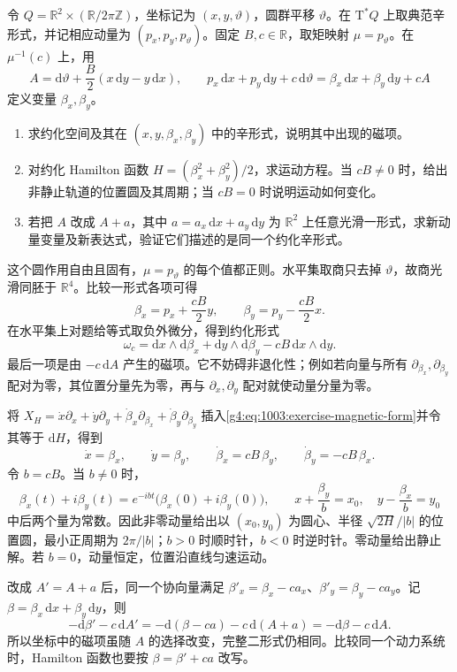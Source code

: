 \begin{exercise}\label{g4:ex:1003:magnetic-cotangent}
	令 \(Q=\mathbb R^2\times(\mathbb R/2\pi\mathbb Z)\)，坐标记为 \((x,y,\vartheta)\)，圆群平移 \(\vartheta\)。在 \(\mathrm{T}^*Q\) 上取典范辛形式，并记相应动量为 \((p_x,p_y,p_\vartheta)\)。固定 \(B,c\in\mathbb R\)，取矩映射 \(\mu=p_\vartheta\)。在 \(\mu^{-1}(c)\) 上，用
	\[
		A=\mathrm{d}\vartheta+\frac B2(x\,\mathrm{d}y-y\,\mathrm{d}x),
		\qquad
		p_x\,\mathrm{d}x+p_y\,\mathrm{d}y+c\,\mathrm{d}\vartheta
		=\beta_x\,\mathrm{d}x+\beta_y\,\mathrm{d}y+cA
	\]
	定义变量 \(\beta_x,\beta_y\)。
	\begin{enumerate}
		\item 求约化空间及其在 \((x,y,\beta_x,\beta_y)\) 中的辛形式，说明其中出现的磁项。
		\item 对约化 Hamilton 函数 \(H=(\beta_x^2+\beta_y^2)/2\)，求运动方程。当 \(cB\ne0\) 时，给出非静止轨道的位置圆及其周期；当 \(cB=0\) 时说明运动如何变化。
		\item 若把 \(A\) 改成 \(A+a\)，其中 \(a=a_x\,\mathrm{d}x+a_y\,\mathrm{d}y\) 为 \(\mathbb R^2\) 上任意光滑一形式，求新动量变量及新表达式，验证它们描述的是同一个约化辛形式。
	\end{enumerate}
\end{exercise}
\begin{solution}
	这个圆作用自由且固有，\(\mu=p_\vartheta\) 的每个值都正则。水平集取商只去掉 \(\vartheta\)，故商光滑同胚于 \(\mathbb R^4\)。比较一形式各项可得
	\[
		\beta_x=p_x+\frac{cB}{2}y,\qquad
		\beta_y=p_y-\frac{cB}{2}x.
	\]
	在水平集上对题给等式取负外微分，得到约化形式
	\begin{equation}\label{g4:eq:1003:exercise-magnetic-form}
		\omega_c
		=\mathrm{d}x\wedge\mathrm{d}\beta_x
		 +\mathrm{d}y\wedge\mathrm{d}\beta_y
		 -cB\,\mathrm{d}x\wedge\mathrm{d}y.
	\end{equation}
	最后一项是由 \(-c\,\mathrm{d}A\) 产生的磁项。它不妨碍非退化性；例如若向量与所有 \(\partial_{\beta_x},\partial_{\beta_y}\) 配对为零，其位置分量先为零，再与 \(\partial_x,\partial_y\) 配对就使动量分量为零。

	将
	\(X_H=\dot x\partial_x+\dot y\partial_y+
	\dot\beta_x\partial_{\beta_x}+\dot\beta_y\partial_{\beta_y}\)
	插入\eqref{g4:eq:1003:exercise-magnetic-form}并令其等于 \(\mathrm{d}H\)，得到
	\[
		\dot x=\beta_x,\qquad \dot y=\beta_y,\qquad
		\dot\beta_x=cB\,\beta_y,\qquad
		\dot\beta_y=-cB\,\beta_x.
	\]
	令 \(b=cB\)。当 \(b\ne0\) 时，
	\[
		\beta_x(t)+i\beta_y(t)
		=e^{-ibt}\bigl(\beta_x(0)+i\beta_y(0)\bigr),
		\qquad
		x+\frac{\beta_y}{b}=x_0,\quad
		y-\frac{\beta_x}{b}=y_0
	\]
	中后两个量为常数。因此非零动量给出以 \((x_0,y_0)\) 为圆心、半径
	\(\sqrt{2H}/|b|\) 的位置圆，最小正周期为 \(2\pi/|b|\)；\(b>0\) 时顺时针，\(b<0\) 时逆时针。零动量给出静止解。若 \(b=0\)，动量恒定，位置沿直线匀速运动。

	改成 \(A'=A+a\) 后，同一个协向量满足
	\(\beta'_x=\beta_x-ca_x\)、\(\beta'_y=\beta_y-ca_y\)。记
	\(\beta=\beta_x\,\mathrm{d}x+\beta_y\,\mathrm{d}y\)，则
	\[
		-\mathrm{d}\beta'-c\,\mathrm{d}A'
		=-\mathrm{d}(\beta-ca)-c\,\mathrm{d}(A+a)
		=-\mathrm{d}\beta-c\,\mathrm{d}A.
	\]
	所以坐标中的磁项虽随 \(A\) 的选择改变，完整二形式仍相同。比较同一个动力系统时，Hamilton 函数也要按 \(\beta=\beta'+ca\) 改写。
\end{solution}

